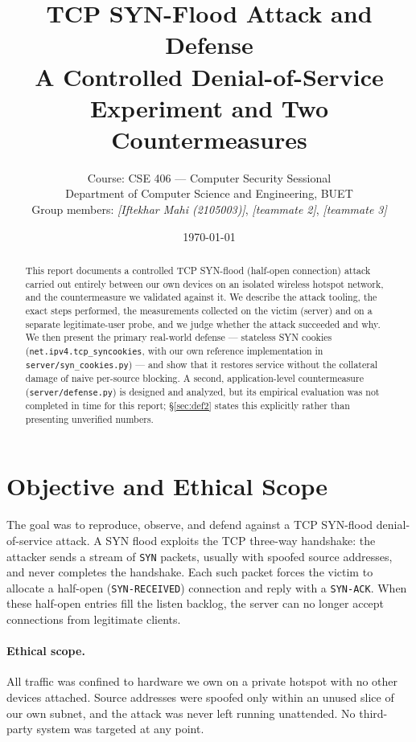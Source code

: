 \documentclass[11pt,a4paper]{article}
\title{\textbf{TCP SYN-Flood Attack and Defense}\\[4pt]
  \large A Controlled Denial-of-Service Experiment and Two Countermeasures}
\author{Course: CSE 406 --- Computer Security Sessional\\
  Department of Computer Science and Engineering, BUET\\[4pt]
  Group members: \emph{[Iftekhar Mahi (2105003)]}, \emph{[teammate 2]}, \emph{[teammate 3]}}
\date{\today}
\begin{document}
\maketitle

\begin{abstract}
This report documents a controlled TCP SYN-flood (half-open connection) attack
carried out entirely between our own devices on an isolated wireless hotspot
network, and the countermeasure we validated against it. We describe the
attack tooling, the exact steps performed, the measurements collected on the
victim (server) and on a separate legitimate-user probe, and we judge whether
the attack succeeded and why. We then present the primary real-world
defense --- stateless SYN cookies (\texttt{net.ipv4.tcp\_syncookies}, with our
own reference implementation in \texttt{server/syn\_cookies.py}) --- and show
that it restores service without the collateral damage of naive per-source
blocking. A second, application-level countermeasure
(\texttt{server/defense.py}) is designed and analyzed, but its empirical
evaluation was not completed in time for this report; \S\ref{sec:def2} states
this explicitly rather than presenting unverified numbers.
\end{abstract}

\tableofcontents
\bigskip

\section{Objective and Ethical Scope}
The goal was to reproduce, observe, and defend against a TCP SYN-flood
denial-of-service attack. A SYN flood exploits the TCP three-way handshake: the
attacker sends a stream of \texttt{SYN} packets, usually with spoofed source
addresses, and never completes the handshake. Each such packet forces the victim
to allocate a half-open (\texttt{SYN-RECEIVED}) connection and reply with a
\texttt{SYN-ACK}. When these half-open entries fill the listen backlog, the
server can no longer accept connections from legitimate clients.

\paragraph{Ethical scope.} All traffic was confined to hardware we own on a
private hotspot with no other devices attached. Source addresses were spoofed
only within an unused slice of our own subnet, and the attack was never left
running unattended. No third-party system was targeted at any point.
\end{document}
